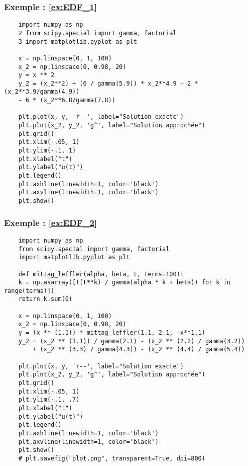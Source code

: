 \subsubsection*{Exemple : \ref{ex:EDF_1}}

\noindent
\begin{verbatim}
    import numpy as np
    2 from scipy.special import gamma, factorial
    3 import matplotlib.pyplot as plt
    
    x = np.linspace(0, 1, 100)
    x_2 = np.linspace(0, 0.98, 20)
    y = x ** 2
    y_2 = (x_2**2) + (6 / gamma(5.9)) * x_2**4.9 - 2 * (x_2**3.9/gamma(4.9)) 
    - 6 * (x_2**6.8/gamma(7.8))
    
    plt.plot(x, y, 'r--', label="Solution exacte")
    plt.plot(x_2, y_2, 'g^', label="Solution approchée")
    plt.grid()
    plt.xlim(-.05, 1)
    plt.ylim(-.1, 1)
    plt.xlabel("t")
    plt.ylabel("u(t)")
    plt.legend()
    plt.axhline(linewidth=1, color='black')
    plt.axvline(linewidth=1, color='black')
    plt.show()
\end{verbatim}
\subsubsection*{Exemple : \ref{ex:EDF_2}}

\noindent
\begin{verbatim}
    import numpy as np
    from scipy.special import gamma, factorial
    import matplotlib.pyplot as plt
    
    def mittag_leffler(alpha, beta, t, terms=100):
    k = np.asarray([((t**k) / gamma(alpha * k + beta)) for k in range(terms)])
    return k.sum(0)

    x = np.linspace(0, 1, 100)
    x_2 = np.linspace(0, 0.98, 20)
    y = (x ** (1.1)) * mittag_leffler(1.1, 2.1, -x**1.1)
    y_2 = (x_2 ** (1.1)) / gamma(2.1) - (x_2 ** (2.2) / gamma(3.2)) 
        + (x_2 ** (3.3) / gamma(4.3)) - (x_2 ** (4.4) / gamma(5.4))
    
    plt.plot(x, y, 'r--', label="Solution exacte")
    plt.plot(x_2, y_2, 'g^', label="Solution approchée")
    plt.grid()
    plt.xlim(-.05, 1)
    plt.ylim(-.1, .7)
    plt.xlabel("t")
    plt.ylabel("u(t)")
    plt.legend()
    plt.axhline(linewidth=1, color='black')
    plt.axvline(linewidth=1, color='black')
    plt.show()
    # plt.savefig("plot.png", transparent=True, dpi=800)
\end{verbatim}

